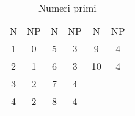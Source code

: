 \documentclass{article}
\begin{document}
\begin{longtable}{*{6}{c}}
\caption{Numeri primi}\label{tab:quanti primi}
\endhead
N &NP&N&NP&N&NP\\
1&0&5&3&9&4\\
2&1&6&3&10&4\\
3&2&7&4&&\\
4&2&8&4&&\\
\toprule
    
\bottomrule
\end{longtable}
\end{document}
